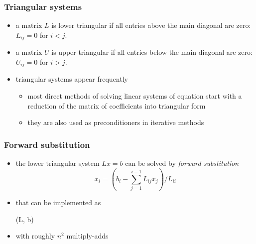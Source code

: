 %
%
%
%


\begin{frame}[fragile]
%
  \frametitle{Triangular systems}
%
  \begin{itemize}
%
  \item a matrix $L$ is lower triangular if all entries above the main diagonal are zero: $L_{ij} =
    0$ for $i < j$.
  \item a matrix $U$ is upper triangular if all entries below the main diagonal are zero: $U_{ij} =
    0$ for $i > j$.
  \item triangular systems appear frequently
    \begin{itemize}
    \item most direct methods of solving linear systems of equation start with a reduction of
      the matrix of coefficients into triangular form
    \item they are also used as preconditioners in iterative methods
    \end{itemize}
%
  \end{itemize}
%
\end{frame}

\begin{frame}[fragile]
%
  \frametitle{Forward substitution}
%
  \begin{itemize}
%
  \item the lower triangular system $Lx = b$ can be solved by {\em forward substitution}
    \begin{equation}
      x_{i} = \left( b_{i} - \sum_{j=1}^{i-1} L_{ij}x_{j} \right) / L_{ii}
    \end{equation}
%
  \item that can be implemented as
    \begin{center}
      \begin{minipage}{.85\linewidth}
        \begin{algorithm}[H]
          \label{alg:forward-substitution}
%
          \dontprintsemicolon
          \setalcaphskip{0ex}
%
          \caption{\forwsub(L, b)}
%
%
        \end{algorithm}
      \end{minipage}
    \end{center}
%
  \item with roughly $n^{2}$ multiply-adds
%
  \end{itemize}
%
\end{frame}

